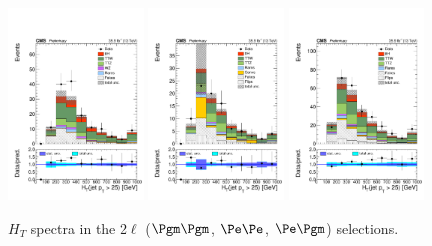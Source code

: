 \begin{figure}[htb]
	\centering 
\includegraphics[width=0.32\textwidth]{plots_leptons/lep_evtsel/2lss_SR/mm/htJet25j.pdf}
\includegraphics[width=0.32\textwidth]{plots_leptons/lep_evtsel/2lss_SR/ee/htJet25j.pdf}
\includegraphics[width=0.32\textwidth]{plots_leptons/lep_evtsel/2lss_SR/em/htJet25j.pdf}
	\caption{$H_T$ spectra in the 2$\ell$ ($\Pgm\Pgm$, $\Pe\Pe$, $\Pe\Pgm$) selections.}
	\label{fig:2l_ht}
\end{figure}
